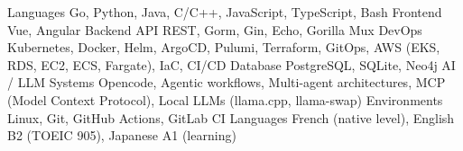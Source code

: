 \documentclass[11pt, a4paper]{awesome-cv}
\begin{document}
\makecvheader




\begin{cvskills}
  \cvskill
    {Languages}
    {Go, Python, Java, C/C++, JavaScript, TypeScript, Bash}
  \cvskill
    {Frontend}
    {Vue, Angular}
  \cvskill
    {Backend}
    {API REST, Gorm, Gin, Echo, Gorilla Mux}
  \cvskill
    {DevOps}
    {Kubernetes, Docker, Helm, ArgoCD, Pulumi, Terraform, GitOps, AWS (EKS, RDS, EC2, ECS, Fargate), IaC, CI/CD}
  \cvskill
    {Database}
    {PostgreSQL, SQLite, Neo4j}
  \cvskill
    {AI / LLM Systems}
    {Opencode, Agentic workflows, Multi-agent architectures, MCP (Model Context Protocol), Local LLMs (llama.cpp, llama-swap)}
  \cvskill
    {Environments}
    {Linux, Git, GitHub Actions, GitLab CI}
  \cvskill
    {Languages}
    {French (native level), English B2 (TOEIC 905), Japanese A1 (learning)}
\end{cvskills}

\end{document}
